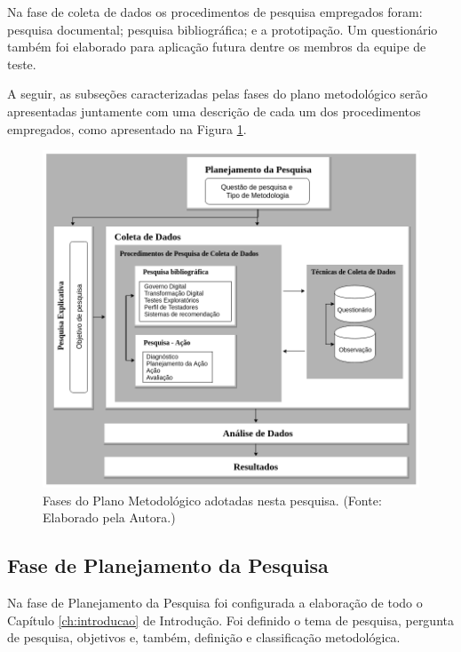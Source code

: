 Na fase de coleta de dados os procedimentos de pesquisa empregados foram: pesquisa documental; pesquisa bibliográfica; e a prototipação. Um questionário também foi elaborado para aplicação futura dentre os membros da equipe de teste.

A seguir, as subseções caracterizadas pelas fases do plano metodológico serão apresentadas juntamente com uma descrição de cada um dos procedimentos empregados, como apresentado na Figura \ref{fig:fasesPlano}.


        \begin{figure}[H]
          \centering
          \includegraphics[width=16cm]{figuras/fasesPlanoMetodologico.png}
          \caption{Fases do Plano Metodológico adotadas nesta pesquisa. (Fonte: Elaborado pela Autora.)} 
          \label{fig:fasesPlano}
        
        \end{figure}


\subsection{Fase de Planejamento da Pesquisa}

Na fase de Planejamento da Pesquisa foi configurada a elaboração de todo o Capítulo \ref{ch:introducao} de Introdução. Foi definido o tema de pesquisa, pergunta de pesquisa, objetivos e, também, definição e classificação metodológica.

